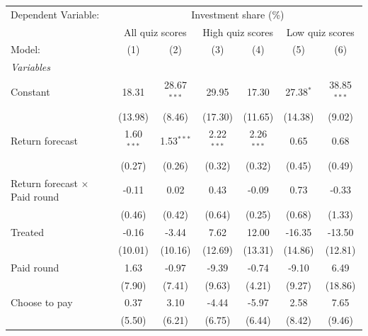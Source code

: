 \begingroup
\centering
\begin{tabular}{lcccccc}
   \tabularnewline \midrule \midrule
   Dependent Variable: & \multicolumn{6}{c}{Investment share (\%)}\\
    & \multicolumn{2}{c}{All quiz scores} & \multicolumn{2}{c}{High quiz scores} & \multicolumn{2}{c}{Low quiz scores} \\ 
   Model:                               & (1)          & (2)           & (3)          & (4)          & (5)         & (6)\\  
   \midrule
   \emph{Variables}\\
   Constant                             & 18.31        & 28.67$^{***}$ & 29.95        & 17.30        & 27.38$^{*}$ & 38.85$^{***}$\\   
                                        & (13.98)      & (8.46)        & (17.30)      & (11.65)      & (14.38)     & (9.02)\\   
   Return forecast                      & 1.60$^{***}$ & 1.53$^{***}$  & 2.22$^{***}$ & 2.26$^{***}$ & 0.65        & 0.68\\   
                                        & (0.27)       & (0.26)        & (0.32)       & (0.32)       & (0.45)      & (0.49)\\   
   Return forecast $\times$ Paid round  & -0.11        & 0.02          & 0.43         & -0.09        & 0.73        & -0.33\\   
                                        & (0.46)       & (0.42)        & (0.64)       & (0.25)       & (0.68)      & (1.33)\\   
   Treated                              & -0.16        & -3.44         & 7.62         & 12.00        & -16.35      & -13.50\\   
                                        & (10.01)      & (10.16)       & (12.69)      & (13.31)      & (14.86)     & (12.81)\\   
   Paid round                           & 1.63         & -0.97         & -9.39        & -0.74        & -9.10       & 6.49\\   
                                        & (7.90)       & (7.41)        & (9.63)       & (4.21)       & (9.27)      & (18.86)\\   
   Choose to pay                        & 0.37         & 3.10          & -4.44        & -5.97        & 2.58        & 7.65\\   
                                        & (5.50)       & (6.21)        & (6.75)       & (6.44)       & (8.42)      & (9.46)\\   

\end{tabular}
